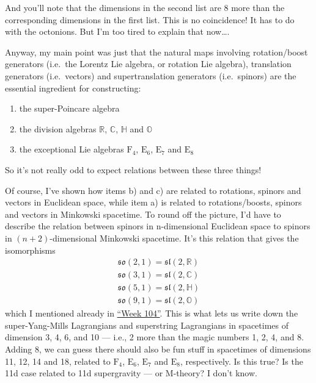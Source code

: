 \documentclass{article}
\begin{document}
And you'll note that the dimensions in the second list are 8 more than
the corresponding dimensions in the first list. This is no coincidence!
It has to do with the octonions. But I'm too tired to explain that
now\ldots.

Anyway, my main point was just that the natural maps involving
rotation/boost generators (i.e.~the Lorentz Lie algebra, or rotation Lie
algebra), translation generators (i.e.~vectors) and supertranslation
generators (i.e.~spinors) are the essential ingredient for constructing:

\begin{enumerate}
\def\labelenumi{\alph{enumi})}
\item
  the super-Poincare algebra
\item
  the division algebras \(\mathbb{R}\), \(\mathbb{C}\), \(\mathbb{H}\)
  and \(\mathbb{O}\)
\item
  the exceptional Lie algebras \(\mathrm{F}_4\), \(\mathrm{E}_6\),
  \(\mathrm{E}_7\) and \(\mathrm{E}_8\)
\end{enumerate}

So it's not really odd to expect relations between these three things!

Of course, I've shown how items b) and c) are related to rotations,
spinors and vectors in Euclidean space, while item a) is related to
rotations/boosts, spinors and vectors in Minkowski spacetime. To round
off the picture, I'd have to describe the relation between spinors in
n-dimensional Euclidean space to spinors in \((n+2)\)-dimensional
Minkowski spacetime. It's this relation that gives the isomorphisms \[
  \begin{gathered}
    \mathfrak{so}(2,1) = \mathfrak{sl}(2,\mathbb{R})
  \\\mathfrak{so}(3,1) = \mathfrak{sl}(2,\mathbb{C})
  \\\mathfrak{so}(5,1) = \mathfrak{sl}(2,\mathbb{H})
  \\\mathfrak{so}(9,1) = \mathfrak{sl}(2,\mathbb{O})
  \end{gathered}
\] which I mentioned already in \protect\hyperlink{week104}{``Week
104''}. This is what lets us write down the super-Yang-Mills Lagrangians
and superstring Lagrangians in spacetimes of dimension 3, 4, 6, and 10
--- i.e., 2 more than the magic numbers 1, 2, 4, and 8. Adding 8, we can
guess there should also be fun stuff in spacetimes of dimensions 11, 12,
14 and 18, related to \(\mathrm{F}_4\), \(\mathrm{E}_6\),
\(\mathrm{E}_7\) and \(\mathrm{E}_8\), respectively. Is this true? Is
the 11d case related to 11d supergravity --- or M-theory? I don't know.
\end{document}
